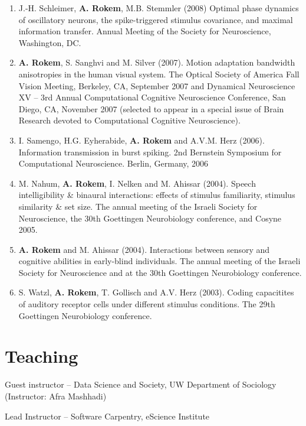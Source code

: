 \documentclass[11pt,fullpage]{article}
\newcommand{\years}[1]{\marginnote{\scriptsize #1}} %
\begin{document}
\begin{enumerate}
\item J.-H. Schleimer, {\bf A. Rokem}, M.B. Stemmler (2008) Optimal phase dynamics of oscillatory neurons, the spike-triggered stimulus covariance, and maximal information transfer. Annual Meeting of the Society for Neuroscience, Washington, DC.

\item {\bf A. Rokem}, S. Sanghvi and M. Silver (2007). Motion adaptation bandwidth anisotropies in the human visual system. The Optical Society of America Fall Vision Meeting, Berkeley, CA, September 2007 and Dynamical Neuroscience XV – 3rd Annual Computational Cognitive Neuroscience Conference, San Diego, CA, November 2007 (selected to appear in a special issue of Brain Research devoted to Computational Cognitive Neuroscience).

\item I. Samengo, H.G. Eyherabide, {\bf A. Rokem} and A.V.M. Herz (2006). Information transmission in burst spiking. 2nd Bernstein Symposium for Computational Neuroscience. Berlin, Germany, 2006

\item M. Nahum, {\bf A. Rokem}, I. Nelken and M. Ahissar (2004). Speech intelligibility \& binaural interactions: effects of stimulus familiarity, stimulus similarity \& set size. The annual meeting of the Israeli Society for Neuroscience, the 30th Goettingen Neurobiology conference, and Cosyne 2005.

\item {\bf A. Rokem} and M. Ahissar (2004). Interactions between sensory and cognitive abilities in early-blind individuals. The annual meeting of the Israeli Society for Neuroscience and at the 30th Goettingen Neurobiology conference.

\item S. Watzl, {\bf A. Rokem}, T. Gollisch and A.V. Herz (2003). Coding capacitites of auditory receptor cells under different stimulus conditions. The 29th Goettingen Neurobiology conference.
\end{enumerate}


\section*{Teaching}
\years{10/2017} Guest instructor -- Data Science and Society, UW Department of Sociology (Instructor: Afra Mashhadi)

\years{10/2017} Lead Instructor -- Software Carpentry, eScience Institute
\end{document}
